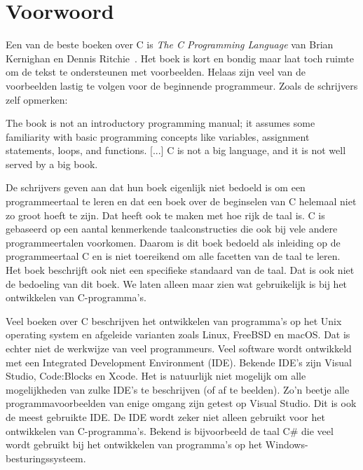 

\chapter{Voorwoord}
\label{cha:voorwoord}
\thispagestyle{empty}

Een van de beste boeken over C is \textsl{The C Programming Language} van
Brian Kernighan en Dennis Ritchie~\cite{kernighan1988c}. Het boek is kort en
bondig maar laat toch ruimte om de tekst te ondersteunen met voorbeelden.
Helaas zijn veel van de voorbeelden lastig te volgen voor de beginnende
programmeur. Zoals de schrijvers zelf opmerken:

\begin{displayquote}
The book is not an introductory programming manual; it assumes some familiarity
with basic programming concepts like variables, assignment statements,
loops, and functions.
[...]
C is not a big language, and it is not well served by a big book.
\end{displayquote}

De schrijvers geven aan dat hun boek eigenlijk niet bedoeld is om een
programmeertaal te leren
en dat een boek over de beginselen van C helemaal niet zo groot hoeft te zijn.
Dat heeft ook te maken met hoe rijk de taal is. C is gebaseerd op een aantal
kenmerkende taalconstructies die ook bij vele andere programmeertalen voorkomen.
Daarom is dit boek bedoeld als inleiding op de programmeertaal C en is niet
toereikend om alle facetten van de taal te leren. Het boek beschrijft ook niet
een specifieke standaard van de taal. Dat is ook niet de
bedoeling van dit boek. We laten alleen maar zien wat gebruikelijk is bij
het ontwikkelen van C-programma's. 

Veel boeken over C beschrijven het ontwikkelen van programma's op het Unix
operating system en afgeleide varianten zoals Linux, FreeBSD en macOS.
Dat is echter niet de werkwijze van veel programmeurs. Veel software wordt
ontwikkeld met een Integrated Development Environment (IDE). Bekende IDE's
zijn Visual Studio, Code:Blocks en Xcode. Het is natuurlijk niet mogelijk
om alle mogelijkheden van zulke IDE's te beschrijven (of af te beelden).
Zo'n beetje alle programmavoorbeelden van enige omgang zijn getest op
Visual Studio. Dit is ook de meest gebruikte IDE. De IDE wordt zeker niet
alleen gebruikt voor het ontwikkelen van C-programma's. Bekend is bijvoorbeeld
de taal C\# die veel wordt gebruikt bij het ontwikkelen van programma's op
het Windows-besturingssysteem.

